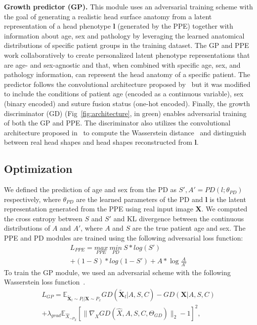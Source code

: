\documentclass[conference]{IEEEtran}
\begin{document}
\textbf{Growth predictor (GP).} This module uses an adversarial training scheme with the goal of generating a realistic head surface anatomy from a latent representation of a head phenotype \textbf{l} (generated by the PPE) together with information about age, sex and pathology by leveraging the learned anatomical distributions of specific patient groups in the training dataset. The GP and PPE work collaboratively to create personalized latent phenotype representations that are age- and sex-agnostic and that, when combined with specific age, sex, and pathology information, can represent the head anatomy of a specific patient. The predictor follows the convolutional architecture proposed by~\cite{Radford2016Unsupervised} but it was modified to include the conditions of patient age (encoded as a continuous variable), sex (binary encoded) and suture fusion status (one-hot encoded).
Finally, the growth discriminator (GD) (Fig~\ref{fig:architecture}, in green) enables adversarial training of both the GP and PPE. The discriminator also utilizes the convolutional architecture proposed in~\cite{Radford2016Unsupervised} to compute the Wasserstein distance~\cite{Gulrajani2017Improved} and distinguish between real head shapes and head shapes reconstructed from \textbf{l}.
\subsection{Optimization}
We defined the prediction of age and sex from the PD as $S',A'=PD(l;\theta_{PD})$ respectively, where $\theta_{PD}$ are the learned parameters of the PD and \textbf{l} is the latent representation generated from the PPE using real input image \textbf{X}. We computed the cross entropy between $S$ and $S'$ and KL divergence between the continuous distributions of $A$ and $A'$, where $A$ and $S$ are the true patient age and sex. The PPE and PD modules are trained using the following adversarial loss function:
\vspace{-2mm}
\begin{multline}\label{ppe}
    L_{PPE}=\underset{PPE}{max}\ \underset{PD}{min}\ S*log(S')\\+(1-S)*log(1-S')+A *\log\frac{A}{A'}
\end{multline}
To train the GP module, we used an adversarial scheme with the following Wasserstein loss function~\cite{Gulrajani2017Improved}.
\vspace{-2mm}
\begin{multline}\label{gp}
    L_{GP} = \mathbb{E} _{\tilde{\textbf{X}}_l \sim P_l | \textbf{X} \sim P_x} GD(\tilde{\textbf{X}}_l|A,S,C)-GD(\textbf{X}|A,S,C)\\ +\lambda _{grad} \mathbb{E} _{\hat{X}_{\sim P_{\hat{X}}}}[\| \nabla_{\hat{X}} GD(\hat{X},A,S,C,\Theta_{GD})\|_2 -1]^2, 
\end{multline}
\end{document}
